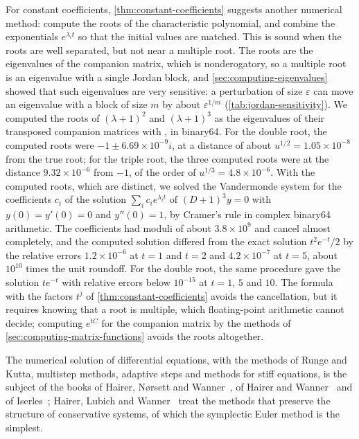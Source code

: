 For constant coefficients, \cref{thm:constant-coefficients} suggests another numerical method: compute the roots of the characteristic polynomial, and combine the exponentials $e^{\lambda_it}$ so that the initial values are matched. This is sound when the roots are well separated, but not near a multiple root. The roots are the eigenvalues of the companion matrix, which is nonderogatory, so a multiple root is an eigenvalue with a single Jordan block, and \cref{sec:computing-eigenvalues} showed that such eigenvalues are very sensitive: a perturbation of size $\varepsilon$ can move an eigenvalue with a block of size $m$ by about $\varepsilon^{1/m}$ (\cref{tab:jordan-sensitivity}). We computed the roots of $(\lambda+1)^2$ and $(\lambda+1)^3$ as the eigenvalues of their transposed companion matrices with , in binary64. For the double root, the computed roots were $-1\pm6.69\times10^{-9}i$, at a distance of about $u^{1/2}=1.05\times10^{-8}$ from the true root; for the triple root, the three computed roots were at the distance $9.32\times10^{-6}$ from $-1$, of the order of $u^{1/3}=4.8\times10^{-6}$. With the computed roots, which are distinct, we solved the Vandermonde system for the coefficients $c_i$ of the solution $\sum_ic_ie^{\lambda_it}$ of $(D+1)^3y=0$ with $y(0)=y'(0)=0$ and $y''(0)=1$, by Cramer's rule in complex binary64 arithmetic. The coefficients had moduli of about $3.8\times10^9$ and cancel almost completely, and the computed solution differed from the exact solution $t^2e^{-t}/2$ by the relative errors $1.2\times10^{-6}$ at $t=1$ and $t=2$ and $4.2\times10^{-7}$ at $t=5$, about $10^{10}$ times the unit roundoff. For the double root, the same procedure gave the solution $te^{-t}$ with relative errors below $10^{-15}$ at $t=1$, $5$ and $10$. The formula with the factors $t^j$ of \cref{thm:constant-coefficients} avoids the cancellation, but it requires knowing that a root is multiple, which floating-point arithmetic cannot decide; computing $e^{tC}$ for the companion matrix by the methods of \cref{sec:computing-matrix-functions} avoids the roots altogether.

The numerical solution of differential equations, with the methods of Runge and Kutta, multistep methods, adaptive steps and methods for stiff equations, is the subject of the books of Hairer, N{\o}rsett and Wanner~\cite{hairer1993}, of Hairer and Wanner~\cite{hairer1996stiff} and of Iserles~\cite{iserles2008}; Hairer, Lubich and Wanner~\cite{hairer2006geometric} treat the methods that preserve the structure of conservative systems, of which the symplectic Euler method is the simplest.

